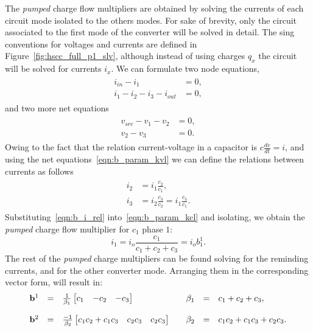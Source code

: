 The \emph{pumped} charge flow multipliers are obtained by solving the currents of each circuit mode isolated to the others modes. For sake of brevity, only the circuit associated to the first mode of the converter will be solved in detail. The sing conventions for voltages and currents are defined in Figure~\ref{fig:hscc_full_p1_slv}, although instead of using charges $q_x$ the circuit will be solved for currents $i_x$. We can formulate two node equations,
\begin{align}
\label{eqn:b_param_kcl}
\begin{split}
  i_{in} - i_1 & = 0,\\
  i_1  - i_2 - i_3 - i_{out} &=0,
\end{split}
\end{align}
and two more net equations
\begin{align}
\label{eqn:b_param_kvl}
\begin{split}
  v_{src} - v_1 - v_2  & = 0,\\
  v_2 - v_3&=0.
\end{split}
\end{align}
Owing to the fact that the relation current-voltage in a capacitor is $c \frac{dv}{dt} = i$, and using the net equations~\eqref{eqn:b_param_kvl} we can define the relations between currents as follows
\begin{align}
\label{eqn:b_i_rel}
\begin{split}
  i_2 & = i_1 \frac{c_2}{c_1},\\
  i_3 & = i_2 \frac{c_3}{c_2} = i_1 \frac{c_3}{c_1}.
\end{split}
\end{align}
Substituting~\eqref{eqn:b_i_rel} into~\eqref{eqn:b_param_kcl} and isolating, we obtain the \emph{pumped} charge flow multiplier for $c_1$ phase $1$:
\begin{equation}
  i_1  = i_o \frac{c_1}{c_1+c_2+c_3} = i_o b_1^1.
\label{eqn:b_c1_p1}
\end{equation}
The rest of the \emph{pumped} charge multipliers can be found solving for the reminding currents, and for the other converter mode. Arranging them in the corresponding vector form, will result in:
\begin{equation}
\begin{array}{rclcrcl}
\mathbf{b}^1 &=& \frac{1}{\beta_1}\begin{bmatrix} c_1 & -c_2 & -c_3 \end{bmatrix} & & \beta_1 &=& c_1+c_2+c_3,\\
\\
\mathbf{b}^2 &=& \frac{-1}{\beta_2}\begin{bmatrix} c_1c_2 + c_1c_3 & c_2c_3 &  c_2c_3  \end{bmatrix} & &  \beta_2  &=& c_1c_2+c_1c_3+c_2c_3.
\end{array}
\end{equation}


